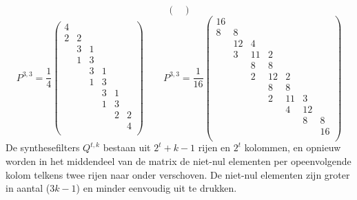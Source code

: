 \begin{enumerate}
{\begin{itemize}
$$\begin{pmatrix}
			\end{pmatrix}
			$$
			$$
			P^{3, 3} = \frac{1}{4}
			\begin{pmatrix}
				4 &   &   &   &   &   \\ %
				2 & 2 &   &   &   &   \\ %
				  & 3 & 1 &   &   &   \\ %
				  & 1 & 3 &   &   &   \\ %
				  &   & 3 & 1 &   &   \\ %
				  &   & 1 & 3 &   &   \\ %
				  &   &   & 3 & 1 &   \\ %
				  &   &   & 1 & 3 &   \\ %
				  &   &   &   & 2 & 2 \\ %
				  &   &   &   &   & 4 \\ %
			\end{pmatrix}
			\qquad
			P^{3, 3} = \frac{1}{16}
			\begin{pmatrix}
				16 &    &    &    &    &    &     \\ %
				8  & 8  &    &    &    &    &     \\ %
				   & 12 & 4  &    &    &    &     \\ %
				   & 3  & 11 &  2 &    &    &     \\ %
				   &    & 8  &  8 &    &    &     \\ %
				   &    & 2  & 12 & 2  &    &     \\ %
				   &    &    & 8  & 8  &    &     \\ %
				   &    &    & 2  & 11 &  3 &     \\ %
				   &    &    &    & 4  & 12 &     \\ %
				   &    &    &    &    &  8 &  8  \\ %
				   &    &    &    &    &    & 16  \\ %
			\end{pmatrix}
			$$
			De synthesefilters $Q^{t,k}$ bestaan uit $2^t +k - 1$ rijen en $2^t$ kolommen, en opnieuw worden in het middendeel van de matrix de niet-nul elementen per opeenvolgende kolom telkens twee rijen naar onder verschoven. De niet-nul elementen zijn groter in aantal ($3k - 1$) en minder eenvoudig uit te drukken. 
		\end{itemize}
		}

\end{enumerate}

